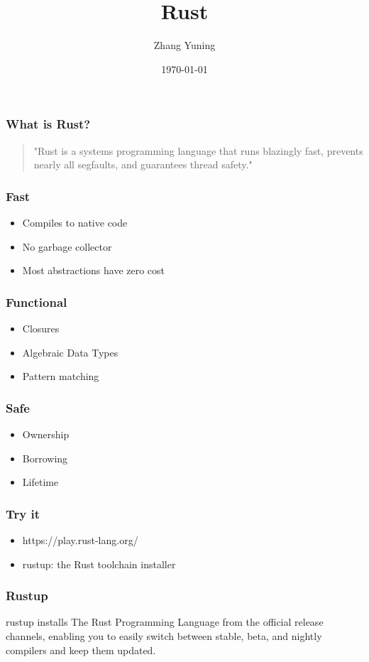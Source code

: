 \documentclass[11pt]{beamer}
\begin{document}
\title{Rust}
\author{Zhang Yuning}
\date{\today}
\begin{frame}
\titlepage
\end{frame}


\begin{frame}
\frametitle{What is Rust?}
\begin{quotation}
"Rust is a systems programming language that runs blazingly fast,
prevents nearly all segfaults, and guarantees thread safety."
\end{quotation}
\end{frame}

\begin{frame}
\frametitle{Fast}
\begin{itemize}
\item Compiles to native code
\item No garbage collector
\item Most abstractions have zero cost
\end{itemize}
\end{frame}

\begin{frame}
\frametitle{Functional}
\begin{itemize}
\item Closures
\item Algebraic Data Types
\item Pattern matching
\end{itemize}
\end{frame}

\begin{frame}
\frametitle{Safe}
\begin{itemize}
\item Ownership
\item Borrowing
\item Lifetime
\end{itemize}
\end{frame}


\begin{frame}
\frametitle{Try it}
\begin{itemize}
\item https://play.rust-lang.org/
\item rustup: the Rust toolchain installer
\end{itemize}
\end{frame}

\begin{frame}
\frametitle{Rustup}
rustup installs The Rust Programming Language from the official release channels,
enabling you to easily switch between stable, beta, and nightly compilers
and keep them updated.
\end{frame}
\end{document}

